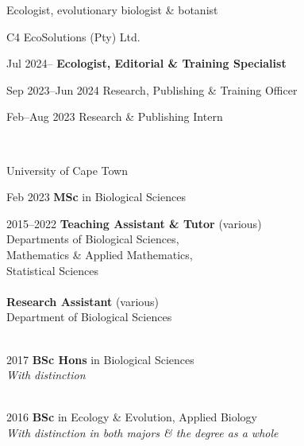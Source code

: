 \documentclass[12pt]{article}
\begin{document}



\bigskip

\begin{center}
  Ecologist, evolutionary biologist \& botanist
\end{center}

C4 EcoSolutions (Pty) Ltd.

Jul 2024-- \hspace{5.15em} \textbf{Ecologist, Editorial \& Training Specialist}

Sep 2023--Jun 2024 \hspace{0.5em} Research, Publishing \& Training Officer

Feb--Aug 2023 \hspace{2.75em} Research \& Publishing Intern

\

University of Cape Town

Feb 2023   \hspace{5.1em} \textbf{MSc} in Biological Sciences

2015--2022 \hspace{1.5em} \textbf{Teaching Assistant \& Tutor} (various) \\
           \hspace{6.75em} Departments of Biological Sciences, \\
                            \hspace{13em} Mathematics \& Applied Mathematics, \\
                            \hspace{13em} Statistical Sciences \\
           \ \\
           \hspace{6.75em} \textbf{Research Assistant} (various) \\
           \hspace{6.75em} Department of Biological Sciences \\
\

2017       \hspace{4.25em} \textbf{BSc Hons} in Biological Sciences \\
           \hspace{6.75em} \textit{With distinction} \\
\

2016       \hspace{4.25em} \textbf{BSc} in Ecology \& Evolution, Applied Biology \\
           \hspace{6.75em} \textit{With distinction in both majors \& the degree as a whole} \\
\
\end{document}
